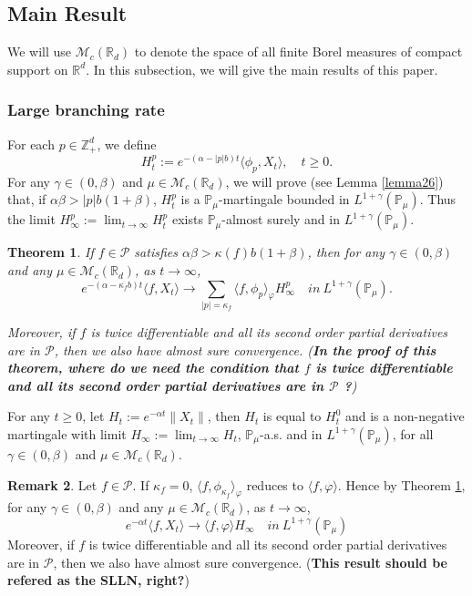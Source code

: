 \documentclass[12pt,a4paper]{amsart}
\theoremstyle{plain}
\newtheorem{thm}{Theorem}[section]
\theoremstyle{definition}
\newtheorem{rem}[thm]{Remark}
\numberwithin{equation}{section}
\begin{document}
\subsection{Main Result}
We will use $\mathcal M_c(\mathbb R_d)$ to denote the space of all
finite Borel measures of compact support on $\mathbb R^d$.
In this subsection, we will give the main results of this paper.
\subsubsection{Large branching rate}

For each $p\in \mathbb{Z}_+^d$, we define
$$H_t^p:= e^{-(\alpha-|p|b)t}\langle\phi_p,X_t\rangle,\quad t\geq 0.$$
  For any $\gamma\in (0, \beta)$ and $\mu\in \mathcal M_c(\mathbb R_d)$, we will prove (see Lemma \ref{lemma26}) that, if $\alpha\beta>|p|b(1+\beta)$, $H_t^p$ is a $\mathbb{P}_{\mu}$-martingale bounded in
   $L^{1+\gamma}(\mathbb{P}_{\mu})$.
  Thus the limit $H^p_{\infty}:=\lim_{t\rightarrow \infty}H_t^p$ exists $\mathbb{P}_{\mu}$-almost surely and in $L^{1+\gamma}(\mathbb{P}_{\mu})$.
 \begin{thm}\label{Theorem11}
     If $f \in \mathcal{P}$ satisfies $\alpha\beta>\kappa(f)b(1+\beta)$, then for
any $\gamma\in (0, \beta)$ and any $\mu\in \mathcal M_c(\mathbb R_d)$,
     as $t\rightarrow \infty$,
     $$e^{-(\alpha-\kappa_fb)t}\langle f, X_t\rangle \rightarrow\sum_{|p|=\kappa_f}\langle f, \phi_p\rangle_{\varphi} H_{\infty}^p \quad in~ L^{1+\gamma}(\mathbb{P}_{\mu}).$$

     Moreover, if $f$ is twice differentiable and all its second order partial derivatives are in $\mathcal{P}$, then we also have almost sure convergence. ({\bf In the proof of this theorem, where do we need the condition that $f$ is twice differentiable and all its second order partial derivatives are in $\mathcal{P}$ ?})
 \end{thm}
For any $t\geq 0$, let $H_t:=e^{-\alpha t}\|X_t\|$, then $H_t$ is equal to $H_t^0$ and is a non-negative martingale with limit $H_{\infty}:=\lim_{t\rightarrow\infty}H_t$,  $\mathbb{P}_{\mu}$-a.s. and in $L^{1+\gamma}(\mathbb{P}_{\mu})$, for all $\gamma\in (0, \beta)$ and $\mu\in \mathcal M_c(\mathbb R_d)$.
 \begin{rem}
Let $f \in \mathcal{P}$.  If $\kappa_f=0$,
    $\langle f, \phi_{\kappa_f}\rangle_{\varphi}$ reduces to $\langle f,\varphi\rangle$. Hence by Theorem \ref{Theorem11},
for any $\gamma\in (0, \beta)$ and any $\mu\in \mathcal M_c(\mathbb R_d)$, as $t\rightarrow \infty$,
     $$e^{-\alpha t}\langle f, X_t\rangle \rightarrow \langle f, \varphi\rangle H_{\infty} \quad in~ L^{1+\gamma}(\mathbb{P}_{\mu})$$
    Moreover, if $f$ is twice differentiable and all its second order partial derivatives are in $\mathcal{P}$, then we also have almost sure convergence. ({\bf This result should be refered as the SLLN, right?})
 \end{rem}
\end{document}
